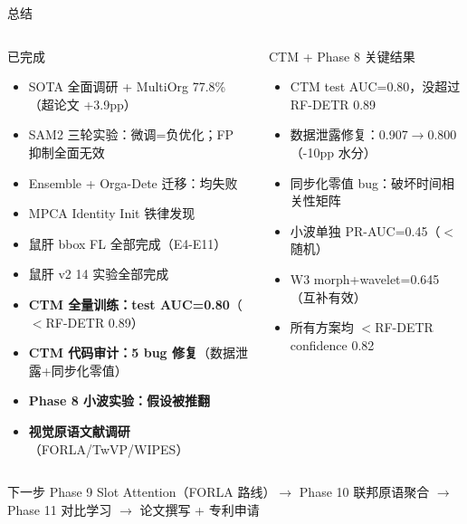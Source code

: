 \documentclass[aspectratio=169, 10pt]{beamer}
\begin{document}
\begin{frame}{总结}
  \begin{columns}[T]
    \begin{block}{已完成}
      \begin{itemize}
        \item[\checkmark] SOTA 全面调研 + MultiOrg 77.8\%（超论文 +3.9pp）
        \item[\checkmark] SAM2 三轮实验：微调=负优化；FP 抑制全面无效
        \item[\checkmark] Ensemble + Orga-Dete 迁移：均失败
        \item[\checkmark] MPCA Identity Init 铁律发现
        \item[\checkmark] 鼠肝 bbox FL 全部完成（E4-E11）
        \item[\checkmark] 鼠肝 v2 14 实验全部完成
        \item[\checkmark] \textbf{CTM 全量训练：test AUC=0.80}（$<$RF-DETR 0.89）
        \item[\checkmark] \textbf{CTM 代码审计：5 bug 修复}（数据泄露+同步化零值）
        \item[\checkmark] \textbf{Phase 8 小波实验：假设被推翻}
        \item[\checkmark] \textbf{视觉原语文献调研}（FORLA/TwVP/WIPES）
      \end{itemize}
    \end{block}
    \begin{alertblock}{CTM + Phase 8 关键结果}
      \begin{itemize}
        \item CTM test AUC=0.80，没超过 RF-DETR 0.89
        \item 数据泄露修复：0.907$\to$0.800（-10pp 水分）
        \item 同步化零值 bug：破坏时间相关性矩阵
        \item 小波单独 PR-AUC=0.45（$<$随机）
        \item W3 morph+wavelet=0.645（互补有效）
        \item 所有方案均 $<$RF-DETR confidence 0.82
      \end{itemize}
    \end{alertblock}
  \end{columns}
  \vspace{0em}
  \begin{alertblock}{下一步}
    Phase 9 Slot Attention（FORLA 路线）$\to$ Phase 10 联邦原语聚合 $\to$ Phase 11 对比学习 $\to$ 论文撰写 + 专利申请
  \end{alertblock}
\end{frame}
\end{document}
